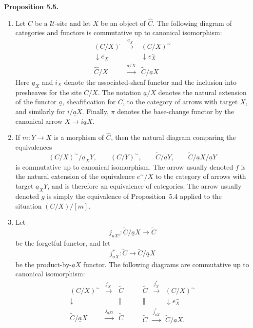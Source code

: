 \documentclass[11pt]{article}
\newcommand{\U}{\mathcal{U}}
\newenvironment{statement}[1]{\par\medskip\noindent\textbf{#1.}\ }{\par\medskip}
\begin{document}
\begin{statement}{Proposition 5.5}
\begin{enumerate}[label=\arabic*)]
\item Let \(C\) be a \(\U\)-site and let \(X\) be an object of \(\widehat C\). The following diagram of categories and functors is commutative up to canonical isomorphism:
\[
\begin{array}{ccc}
(C/X)^{\widehat{\ }} & \xrightarrow{\underline a_X} & (C/X)^{\sim}\\
\downarrow e_X^{\widehat{\ }} && \downarrow e_X^{\sim}\\
\widehat C/X & \xrightarrow{\underline a/X} & \widetilde C/\underline aX
\end{array}
\]
Here \(\underline a_X\) and \(i_X\) denote the associated-sheaf functor and the inclusion into presheaves for the site \(C/X\). The notation \(\underline a/X\) denotes the natural extension of the functor \(\underline a\), sheafification for \(C\), to the category of arrows with target \(X\), and similarly for \(i/\underline aX\). Finally, \(\pi\) denotes the base-change functor by the canonical arrow \(X\to i\underline aX\).

\item If \(m:Y\to X\) is a morphism of \(\widehat C\), then the natural diagram comparing the equivalences
\[
(C/X)^{\sim}/\underline a_XY,
\qquad
(C/Y)^{\sim},
\qquad
\widetilde C/\underline aY,
\qquad
\widetilde C/\underline aX/\underline aY
\]
is commutative up to canonical isomorphism. The arrow usually denoted \(f\) is the natural extension of the equivalence \(e^{\sim}/X\) to the category of arrows with target \(\underline a_XY\), and is therefore an equivalence of categories. The arrow usually denoted \(g\) is simply the equivalence of Proposition~5.4 applied to the situation \((C/X)/[m]\).

\item Let
\[
j_{\underline aX!}:\widetilde C/\underline aX\to\widetilde C
\]
be the forgetful functor, and let
\[
j^*_{\underline aX}:\widetilde C\to\widetilde C/\underline aX
\]
be the product-by-\(\underline aX\) functor. The following diagrams are commutative up to canonical isomorphism:
\[
\begin{array}{ccc}
(C/X)^{\sim}&\xrightarrow{j_{X!}}&\widetilde C\\
\downarrow&&\Vert\\
\widetilde C/\underline aX&\xrightarrow{j_{\underline aX!}}&\widetilde C
\end{array}
\qquad
\begin{array}{ccc}
\widetilde C&\xrightarrow{j_X^*}&(C/X)^{\sim}\\
\Vert&&\downarrow e_X^{\sim}\\
\widetilde C&\xrightarrow{j^*_{\underline aX}}&\widetilde C/\underline aX.
\end{array}
\]
\end{enumerate}
\end{statement}
\end{document}

